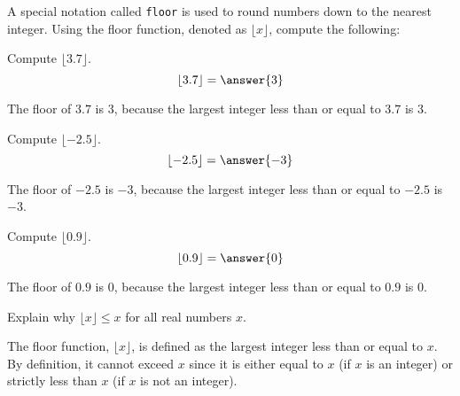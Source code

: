 \documentclass{ximera}
\author{Jont Allen}
\begin{document}
    A special notation called \texttt{floor} is used to round numbers down to the nearest integer. 
    Using the floor function, denoted as $\lfloor x \rfloor$, compute the following:    
    \begin{problem}
    Compute $\lfloor 3.7 \rfloor$.
    \[
        \lfloor 3.7 \rfloor = \answer{3}
    \]
    \begin{feedback}[correct]
    The floor of $3.7$ is $3$, because the largest integer less than or equal to $3.7$ is $3$.
    \end{feedback}
    \end{problem}
    
    \begin{problem}
    Compute $\lfloor -2.5 \rfloor$.
    \[
        \lfloor -2.5 \rfloor = \answer{-3}
    \]
    \begin{feedback}[correct]
    The floor of $-2.5$ is $-3$, because the largest integer less than or equal to $-2.5$ is $-3$.
\end{feedback}

    \end{problem}
    
    \begin{problem}
    Compute $\lfloor 0.9 \rfloor$.
    \[
        \lfloor 0.9 \rfloor= \answer{0}
    \]
    \begin{feedback}[correct]
    The floor of $0.9$ is $0$, because the largest integer less than or equal to $0.9$ is $0$.
\end{feedback}

    \end{problem}
    
    \begin{problem}
    Explain why $\lfloor x \rfloor \leq x$ for all real numbers $x$.
    \begin{multipleChoice}
    \end{multipleChoice}
    \begin{feedback}[correct]
    The floor function, $\lfloor x \rfloor$, is defined as the largest integer less than or equal to $x$. 
    By definition, it cannot exceed $x$ since it is either equal to $x$ (if $x$ is an integer) or strictly less than $x$ (if $x$ is not an integer).
\end{feedback}

    \end{problem}
\end{document}
